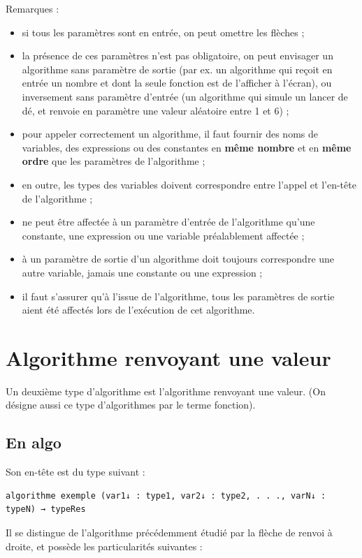 \documentclass[11pt,a4paper]{article}
\begin{document}
            \par
        
        Remarques : 
        
					\begin{itemize}
				
			\item si tous les param\`etres sont en entr\'ee, on peut omettre les fl\`eches ;
			\item 
              la pr\'esence de ces param\`etres n'est pas obligatoire, on peut envisager un algorithme sans
              param\`etre de sortie (par ex. un algorithme qui re\c coit en entr\'ee un nombre et dont la seule
              fonction est de l'afficher \`a l'\'ecran), ou inversement sans param\`etre d'entr\'ee (un algorithme 
              qui simule un lancer de d\'e, et renvoie en param\`etre une valeur al\'eatoire entre 1 et 6) ;
            
			\item 
              pour appeler correctement un algorithme, il faut fournir des noms de variables, des expressions ou des constantes 
              en \textbf{m\^eme nombre} et en \textbf{m\^eme ordre} 
              que les param\`etres de l'algorithme ;
            
			\item en outre, les types des variables doivent correspondre entre l'appel et l'en-t\^ete de l'algorithme ;
			\item ne peut \^etre affect\'ee \`a un param\`etre d'entr\'ee de l'algorithme  qu'une constante, une expression ou une variable pr\'ealablement affect\'ee ;
			\item \`a un param\`etre de sortie d'un algorithme doit toujours correspondre une autre variable, jamais une constante ou une expression ;
			\item il faut s'assurer qu'\`a l'issue de l'algorithme, tous les param\`etres de sortie aient \'et\'e affect\'es lors de l'ex\'ecution de cet algorithme.
					\end{itemize}
				
            \par
        \section{Algorithme renvoyant une valeur}Un deuxi\`eme type d'algorithme est l'algorithme renvoyant une valeur. 
    (On d\'esigne aussi ce type d'algorithmes par le terme fonction).\subsection{En algo}Son en-t\^ete est du type suivant :
            \par
        \begin{verbatim}
algorithme exemple (var1↓ : type1, var2↓ : type2, . . ., varN↓ : typeN) → typeRes
      \end{verbatim}
        Il se distingue de l'algorithme pr\'ec\'edemment \'etudi\'e par la fl\`eche de renvoi \`a droite,
        et poss\`ede les particularit\'es suivantes :
      
\end{document}
